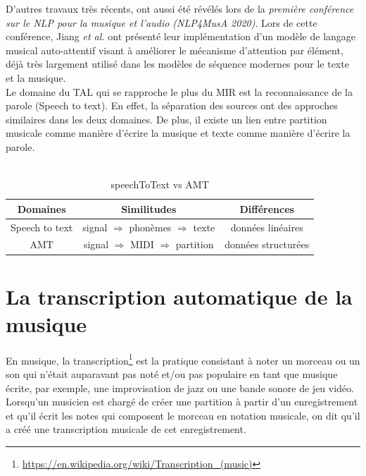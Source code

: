 D’autres travaux
très récents, ont aussi été révélés lors de la \textit{première conférence sur
le NLP pour la musique et l'audio (NLP4MusA 2020)}. Lors de cette conférence,
Jiang \textit{et al.} \cite{Jiang2020DiscoveringMR} ont présenté leur
implémentation d’un modèle de langage musical auto-attentif visant à améliorer
le mécanisme d'attention par élément, déjà très largement utilisé dans les
modèles de séquence modernes pour le texte et la musique.\\
Le domaine du TAL qui se rapproche le plus du MIR est la reconnaissance de la
parole (Speech to text). En effet, la séparation des sources ont des approches
similaires dans les deux domaines. De plus, il existe un lien entre partition
musicale comme manière d’écrire la musique et texte comme manière d’écrire la
parole.\\\\
\begin{table}[h]
	\centering
	\begin{tabular}{|c|c|c|} \hline
		Domaines & Similitudes & Différences \\ \hline
		Speech to text & signal $\Rightarrow$ phonèmes $\Rightarrow$
        texte & données linéaires\\
		AMT & signal $\Rightarrow$ MIDI $\Rightarrow$ partition & données
        structurées\\ \hline
	\end{tabular}
	\caption{speechToText vs AMT}
	\label{spToTxt_vs_AMT}
\end{table}


\section{La transcription automatique de la musique}
En musique, la transcription\footnote{\url{
https://en.wikipedia.org/wiki/Transcription_(music)}} 
est la pratique
consistant à noter un morceau ou un son qui n'était auparavant pas noté et/ou
pas populaire en tant que musique écrite, par exemple, une improvisation de
jazz ou une bande sonore de jeu vidéo. Lorsqu'un musicien est chargé de créer
une partition à partir d'un enregistrement et qu'il écrit les notes qui
composent le morceau en notation musicale, on dit qu'il a créé une
transcription musicale de cet enregistrement.

